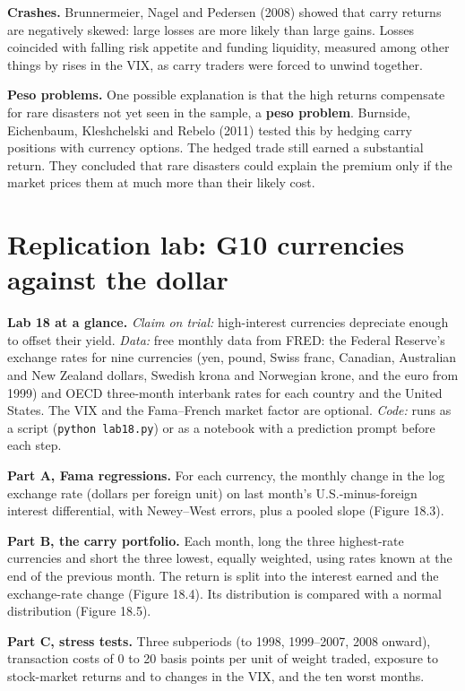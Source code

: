 \textbf{Crashes.} Brunnermeier, Nagel and Pedersen (2008) showed that carry returns are negatively skewed: large losses are more likely than large gains. Losses coincided with falling risk appetite and funding liquidity, measured among other things by rises in the VIX, as carry traders were forced to unwind together.

\textbf{Peso problems.} One possible explanation is that the high returns compensate for rare disasters not yet seen in the sample, a \textbf{peso problem}. Burnside, Eichenbaum, Kleshchelski and Rebelo (2011) tested this by hedging carry positions with currency options. The hedged trade still earned a substantial return. They concluded that rare disasters could explain the premium only if the market prices them at much more than their likely cost.

\section{Replication lab: G10 currencies against the dollar}
\label{sec:18-lab}

\begin{callout}
\textbf{Lab 18 at a glance.} \emph{Claim on trial:} high-interest currencies depreciate enough to offset their yield. \emph{Data:} free monthly data from FRED: the Federal Reserve's exchange rates for nine currencies (yen, pound, Swiss franc, Canadian, Australian and New Zealand dollars, Swedish krona and Norwegian krone, and the euro from 1999) and OECD three-month interbank rates for each country and the United States. The VIX and the Fama--French market factor are optional. \emph{Code:} runs as a script (\texttt{python lab18.py}) or as a notebook with a prediction prompt before each step.
\end{callout}

\textbf{Part A, Fama regressions.} For each currency, the monthly change in the log exchange rate (dollars per foreign unit) on last month's U.S.-minus-foreign interest differential, with Newey--West errors, plus a pooled slope (Figure 18.3).

\textbf{Part B, the carry portfolio.} Each month, long the three highest-rate currencies and short the three lowest, equally weighted, using rates known at the end of the previous month. The return is split into the interest earned and the exchange-rate change (Figure 18.4). Its distribution is compared with a normal distribution (Figure 18.5).

\textbf{Part C, stress tests.} Three subperiods (to 1998, 1999--2007, 2008 onward), transaction costs of 0 to 20 basis points per unit of weight traded, exposure to stock-market returns and to changes in the VIX, and the ten worst months.

